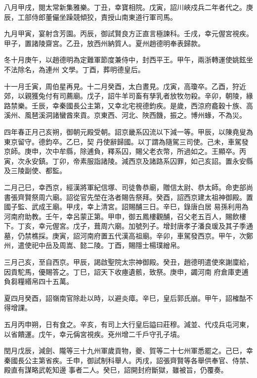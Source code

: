 \begin{pinyinscope}
 八月甲戌，閱太常新集雅樂。丁丑，幸寶相院。戊寅，詔川峽戍兵二年者代之。庚辰，工部侍郎董儼坐躁競傾狡，責授山南東道行軍司馬。



 九月甲寅，宴射含芳園。丙辰，御試賢良方正直言極諫科。壬戌，幸元偓宮視疾。甲子，置諸陵齋宮。乙丑，放西州納質人。夏州趙德明奉表歸款。



 冬十月庚午，以趙德明為定難軍節度兼侍中，封西平王。甲午，兩浙轉運使姚鉉坐不法除名，為連州
 文學。丁酉，葬明德皇后。



 十一月壬寅，周伯星再見。十二月癸酉，太白晝見。戊寅，高瓊卒。乙酉，狩近郊，以親獲兔付有司薦廟。戊子，詔牛羊司畜有孳乳者放牧勿殺。辛卯，朝陵，緣路禁樂。壬辰，幸秦國長公主第，又幸北宅視德鈞疾。是歲，西涼府龕穀十族、高溪州、風琶溪洞諸蠻酋來貢。京東西、河北、陜西饑，振之。博州蝝，不為災。



 四年春正月己亥朔，御朝元殿受朝。詔京畿系囚流以下減一等。甲辰，以陳堯叟為東京留守。德鈞卒。乙巳，契
 丹使辭歸國。以丁謂為隨駕三司使。己未，車駕發京師。庚申，次中牟縣，除逋負，釋系囚，賜父老衣幣，所過如之。王顯卒。丙寅，次永安鎮。丁卯，帝素服詣諸陵。減西京及諸路系囚罪，如己亥詔。置永安縣及三陵副使、都監。



 二月己巳，幸西京，經漢將軍紀信塚、司徒魯恭廟，贈信太尉、恭太師。命吏部尚書張齊賢祭周六廟。詔從官先塋在洛者賜告祭拜。癸酉，詔西京建太祖神御殿。置國子監、武成王廟。甲戌，幸上清宮。詔賜酺三日。辛巳，錄唐白居
 易孫利用為河南府助教。壬午，幸呂蒙正第。甲申，御五鳳樓觀酺，召父老五百人，賜飲樓下。丁亥，幸元偓宮。戊子，葺周六廟。加號列子。增封唐孝子潘良瑗及其子季通墓，仍禁樵採。庚寅，詔河南府置五代漢高祖廟。辛卯，車駕發西京。甲午，次鄭州，遣使祀中岳及周嵩、懿二陵。丁酉，賜隱士楊璞繒帛。



 三月己亥，至自西京。甲辰，謁啟聖院太宗神御殿。癸丑，趙德明遣使來謝廩給，因貢駝馬，優賜答之。丁巳，詔天下收瘞遺骸，致祭。庚申，蠲河南
 府倉庫吏逋負芻糧緡帛四十五萬。



 夏四月癸酉，詔嶺南官除赴以時，以避炎瘴。辛巳，皇后郭氏崩。甲午，詔榷酤不得增課。



 五月丙申朔，日有食之。辛亥，有司上大行皇后謚曰莊穆。減並、代戍兵屯河東，以省饋運。戊午，幸元偁宮視疾。兗州增二千戶守孔子墳。



 閏月戊辰，減劍、隴等三十九州軍歲貢物，夔、賀等二十七州軍悉罷之。己巳，幸秦國長公主第省疾。壬申，御試制科舉人。丙戌，詔張齊賢等各舉供奉官、侍禁、殿直有謀略武乾知邊
 事者二人。癸巳，詔開封府斷獄，雖被旨，仍覆奏。




\end{pinyinscope}
